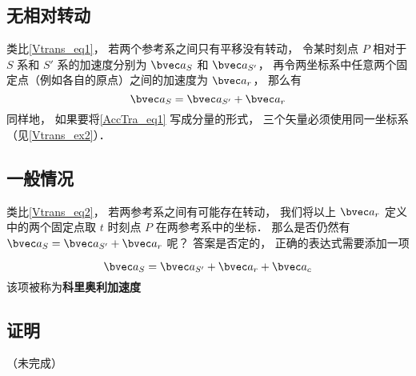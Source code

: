 

\subsection{无相对转动}
类比\autoref{Vtrans_eq1}， 若两个参考系之间只有平移没有转动， 令某时刻点 $P$ 相对于 $S$ 系和 $S'$ 系的加速度分别为 $\bvec a_S$ 和 $\bvec a_{S'}$， 再令两坐标系中任意两个固定点（例如各自的原点）之间的加速度为 $\bvec a_r$， 那么有
\begin{equation}\label{AccTra_eq1}
\bvec a_S = \bvec a_{S'} + \bvec a_r
\end{equation}
同样地， 如果要将\autoref{AccTra_eq1} 写成分量的形式， 三个矢量必须使用同一坐标系（见\autoref{Vtrans_ex2}）．

\subsection{一般情况}
类比\autoref{Vtrans_eq2}， 若两参考系之间有可能存在转动， 我们将以上 $\bvec a_r$ 定义中的两个固定点取 $t$ 时刻点 $P$ 在两参考系中的坐标． 那么是否仍然有 $\bvec a_S = \bvec a_{S'} + \bvec a_r$ 呢？ 答案是否定的， 正确的表达式需要添加一项

\begin{equation}
\bvec a_S = \bvec a_{S'} + \bvec a_r + \bvec a_c
\end{equation}
该项被称为\textbf{科里奥利加速度}

\subsection{证明}
（未完成）%

